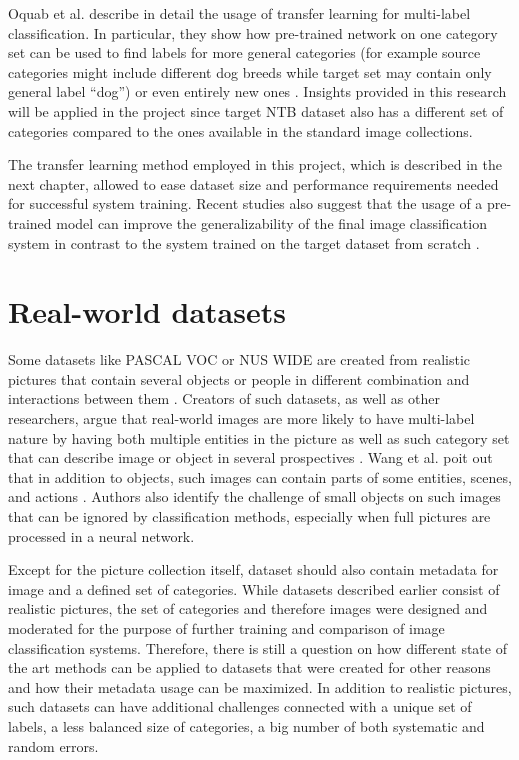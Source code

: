 Oquab et al. describe in detail the usage of transfer learning for multi-label classification. In particular, they show how pre-trained network on one category set can be used to find labels for more general categories (for example source categories might include different dog breeds while target set may contain only general label ``dog'') or even entirely new ones \cite{Oquab2014TransferringMidLevel}. Insights provided in this research will be applied in the project since target NTB dataset also has a different set of categories compared to the ones available in the standard image collections.

The transfer learning method employed in this project, which is described in the next chapter, allowed to ease dataset size and performance requirements needed for successful system training. Recent studies also suggest that the usage of a pre-trained model can improve the generalizability of the final image classification system in contrast to the system trained on the target dataset from scratch \cite{Yosinski2014HowTransferable, Oquab2014TransferringMidLevel}.

\section{Real-world datasets}
Some datasets like PASCAL VOC or NUS WIDE are created from realistic pictures that contain several objects or people in different combination and interactions between them \cite{Everingham2010PASCAL-VOC, Chua2009NUS-WIDE}. Creators of such datasets, as well as other researchers, argue that real-world images are more likely to have multi-label nature by having both multiple entities in the picture as well as such category set that can describe image or object in several prospectives \cite{Wang2016CNN-RNN:Classification, Dong2013Subcategory-AwareClassification, Everingham2010PASCAL-VOC, Chua2009NUS-WIDE}. Wang et al. poit out that in addition to objects, such images can contain parts of some entities, scenes, and actions \cite{Wang2016CNN-RNN:Classification}. Authors also identify the challenge of small objects on such images that can be ignored by classification methods, especially when full pictures are processed in a neural network.

Except for the picture collection itself, dataset should also contain metadata for image and a defined set of categories. While datasets described earlier consist of realistic pictures, the set of categories and therefore images were designed and moderated for the purpose of further training and comparison of image classification systems. Therefore, there is still a question on how different state of the art methods can be applied to datasets that were created for other reasons and how their metadata usage can be maximized. In addition to realistic pictures, such datasets can have additional challenges connected with a unique set of labels, a less balanced size of categories, a big number of both systematic and random errors.

